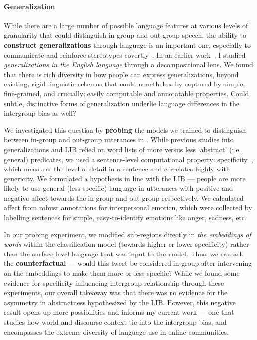 \documentclass[11pt, letterpaper, biblatex]{practical-report}
\begin{document}
\paragraph{Generalization} While there are a large number of possible language features at various levels of granularity that could distinguish in-group and out-group speech, the ability to \textbf{construct generalizations} through language is an important one, especially to communicate and reinforce stereotypes covertly~\citep{wigboldus_how_2000}. In an earlier work~\citep{genericity}, I studied \emph{generalizations in the English language} through a decompositional lens. We found that there is rich diversity in how people can express generalizations, beyond existing, rigid linguistic schemas that could nonetheless by captured by simple, fine-grained, and crucially: easily computable and annotatable properties. Could subtle, distinctive forms of generalization underlie language differences in the intergroup bias as well?

 We investigated this question by \textbf{probing} the models we trained to distinguish between in-group and out-group utterances in \citet{govindarajan-etal-2023-counterfactual}. While previous studies into generalizations and LIB relied on word lists of more versus less `abstract' (i.e. general) predicates, we used a sentence-level computational property: specificity~\citep{gao_predicting_2019}, which measures the level of detail in a sentence and correlates highly with genericity. We formulated a hypothesis in line with the LIB --- people are more likely to use general (less specific) language in utterances with positive and negative affect towards the in-group and out-group respectively. We calculated affect from robust annotations for interpersonal emotion, which were collected by labelling sentences for simple, easy-to-identify emotions like anger, sadness, etc.
 
 In our probing experiment, we modified sub-regions directly in \emph{the embeddings of words} within the classification model (towards higher or lower specificity) rather than the surface level language that was input to the model. Thus, we can ask the \textbf{counterfactual} --- would this tweet be considered in-group after intervening on the embeddings to make them more or less specific? While we found some evidence for specificity influencing intergroup relationship through these experiments, our overall takeaway was that there was no evidence for the asymmetry in abstractness hypothesized by the LIB. However, this negative result opens up more possibilities and informs my current work --- one that studies how world and discourse context tie into the intergroup bias, and encompasses the extreme diversity of language use in online communities. 
\end{document}
